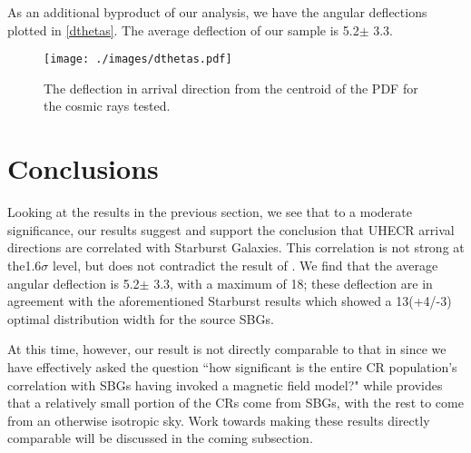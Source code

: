 As an additional byproduct of our analysis, we have the angular deflections plotted in \autoref{dthetas}. The average deflection of our sample is 5.2\degree $\pm$ 3.3\degree. 
\begin{figure}[H]
\centering
\texttt{[image: ./images/dthetas.pdf]}
\caption[Angular Direction Change]{The deflection in arrival direction from the centroid of the PDF for the cosmic rays tested.}
\label{dthetas}
\end{figure}

\section{Conclusions}
Looking at the results in the previous section, we see that to a moderate significance, our results suggest and support the conclusion that UHECR arrival directions are correlated with Starburst Galaxies. This correlation is not strong at the1.6$\sigma$ level, but does not contradict the result of . We find that the average angular deflection is 5.2\degree $\pm$ 3.3\degree, with a maximum of 18\degree; these deflection are in agreement with the aforementioned Starburst results which showed a 13\degree  (+4\degree/-3\degree) optimal distribution width for the source SBGs. 

At this time, however, our result is not directly comparable to that in \textcite{starburst} since we have effectively asked the question ``how significant is the entire CR population's correlation with SBGs having invoked a magnetic field model?" while  provides that a relatively small portion of the CRs come from SBGs, with the rest to come from an otherwise isotropic sky. Work towards making these results directly comparable will be discussed in the coming subsection.
